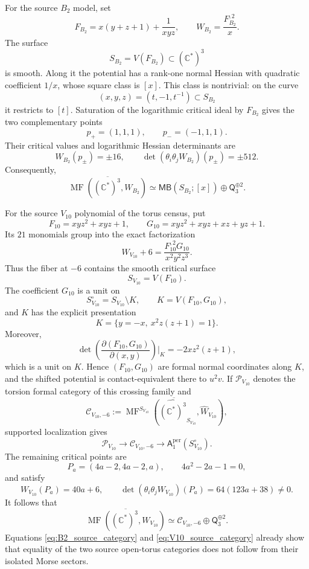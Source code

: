 \documentclass[11pt]{amsart}
\theoremstyle{definition}
\theoremstyle{remark}
\DeclareMathOperator{\MF}{MF}
\newcommand{\MorseCat}[1]{\mathsf{Q}_{#1}}
\newcommand{\MBcat}[1]{\mathsf{MB}(#1)}
\newcommand{\Aper}[2]{\mathsf{A}^{\mathrm{per}}_{#2}(#1)}
\begin{document}
For the source $B_2$ model, set
\begin{equation}
\label{eq:B2_source_factorization}
F_{B_2}=x(y+z+1)+\frac1{xyz},
\qquad
W_{B_2}=\frac{F_{B_2}^{,2}}{x}.
\end{equation}
The surface
\[
S_{B_2}=V(F_{B_2})\subset(\mathbb C^*)^3
\]
is smooth.  Along it the potential has a rank-one normal Hessian with
quadratic coefficient $1/x$, whose square class is $[x]$.  This class is
nontrivial: on the curve
\[
(x,y,z)=(t,-1,t^{-1})\subset S_{B_2}
\]
it restricts to $[t]$.  Saturation of the logarithmic critical ideal by
$F_{B_2}$ gives the two complementary points
\[
p_+=(1,1,1),
\qquad
p_-=(-1,1,1).
\]
Their critical values and logarithmic Hessian determinants are
\[
W_{B_2}(p_\pm)=\pm16,
\qquad
\det(\theta_i\theta_jW_{B_2})(p_\pm)=\pm512.
\]
Consequently,
\begin{equation}
\label{eq:B2_source_category}
\overline{\MF((\mathbb C^*)^3,W_{B_2})}
\simeq
\MBcat{S_{B_2};[x]}\oplus\MorseCat{3}^{\oplus2}.
\end{equation}

For the source $V_{10}$ polynomial of the torus census, put
\[
F_{10}=xyz^2+xyz+1,
\qquad
G_{10}=xyz^2+xyz+xz+yz+1.
\]
Its $21$ monomials group into the exact factorization
\begin{equation}
\label{eq:V10_source_factorization}
W_{V_{10}}+6
=
\frac{F_{10}^{,2}G_{10}}{x^2y^2z^3}.
\end{equation}
Thus the fiber at $-6$ contains the smooth critical surface
\[
S_{V_{10}}=V(F_{10}).
\]
The coefficient $G_{10}$ is a unit on
\[
S_{V_{10}}^\circ=S_{V_{10}}\setminus K,
\qquad
K=V(F_{10},G_{10}),
\]
and $K$ has the explicit presentation
\[
K=\{y=-x,\ x^2z(z+1)=1\}.
\]
Moreover,
\[
\det\!\left(
\frac{\partial(F_{10},G_{10})}{\partial(x,y)}
\right)\bigg|_K
=-2xz^2(z+1),
\]
which is a unit on $K$.  Hence $(F_{10},G_{10})$ are formal normal
coordinates along $K$, and the shifted potential is contact-equivalent there
to $u^2v$.  If $\mathcal P_{V_{10}}$ denotes the torsion formal category of
this crossing family and
\[
\mathcal C_{V_{10},-6}
:=
\overline{\MF^{S_{V_{10}}}
(\widehat{(\mathbb C^*)^3}_{S_{V_{10}}},\widehat W_{V_{10}})},
\]
supported localization gives
\begin{equation}
\label{eq:V10_source_localization}
\mathcal P_{V_{10}}
\longrightarrow
\mathcal C_{V_{10},-6}
\longrightarrow
\Aper{S_{V_{10}}^\circ}{1}.
\end{equation}
The remaining critical points are
\[
P_a=(4a-2,4a-2,a),
\qquad
4a^2-2a-1=0,
\]
and satisfy
\[
W_{V_{10}}(P_a)=40a+6,
\qquad
\det(\theta_i\theta_jW_{V_{10}})(P_a)=64(123a+38)\neq0.
\]
It follows that
\begin{equation}
\label{eq:V10_source_category}
\overline{\MF((\mathbb C^*)^3,W_{V_{10}})}
\simeq
\mathcal C_{V_{10},-6}\oplus\MorseCat{3}^{\oplus2}.
\end{equation}
Equations \eqref{eq:B2_source_category} and
\eqref{eq:V10_source_category} already show that equality of the two source
open-torus categories does not follow from their isolated Morse sectors.
\end{document}
